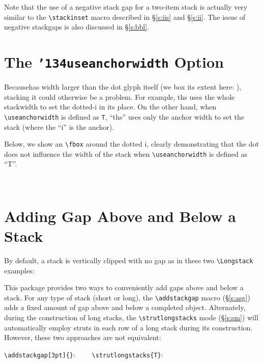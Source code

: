 \documentclass{article}
\newlength\dotscale
\def\newdot{\scalerel*{.}{\rule[-\dotscale]{1ex}{\dotscale}}}
\def\newdot{\scalerel*{.}{\rule{1ex}{\dotscale}}}
\let\vb\verb
\newcommand\cmd[1]{\texttt{\char'134#1}}
\begin{document}
Note that the use of a negative stack gap for a two-item stack is
actually very similar to the \vb|\stackinset| macro described in
\S\ref{s:iis} and \S\ref{s:ii}.  The issue of negative stackgaps is also
discussed in \S\ref{s:bbl}.

\section{The {\cmd{useanchorwidth}} Option\label{s:uaw}}
\setlength{\dotscale}{1.ex}

Because\newdot has width larger than the dot glyph itself (we box its
extent here: \fbox{\newdot}), stacking it could otherwise be a problem.
For example, th\stackon{i}{\newdot}s uses the whole stackwidth to set
the dotted-i in its place. 
\def\useanchorwidth{T} 
On the other hand, when \vb|\useanchorwidth| is defined as \vb|T|,
``th\stackon{i}{\newdot}s'' uses only the anchor width to set the stack
(where the ``i'' is the anchor).  

Below, we show an \vb|\fbox| around the dotted i, clearly
demonstrating that the dot does not influence the width of the
stack when \vb|\useanchorwidth| is defined as ``T''.

\fboxrule=0.2pt
\hfill 
\scalebox{3}{th\fbox{\stackon{i}{\newdot}}s}%
\hfill~
\normalsize
\def\useanchorwidth{F} 
\fboxrule=0.6pt

\section{Adding Gap Above and Below a Stack\label{s:ag}}

By default, a stack is vertically clipped with no gap as in these
two \vb|\Longstack| examples:

This package provides two ways to conveniently add gaps above and below
a stack.  For any type of stack (short or long), the \vb|\addstackgap|
macro (\S\ref{s:asg}) adds a fixed amount of gap above and below a
completed object.  Alternately, during the construction of long stacks,
the \vb|\strutlongstacks| mode (\S\ref{s:sm}) will automatically employ
struts in each row of a long stack during its construction.  However,
these two approaches are not equivalent:

\vb|\addstackgap[3pt]{}|:
~~~~\vb|\strutlongstacks{T}|:
\end{document}
